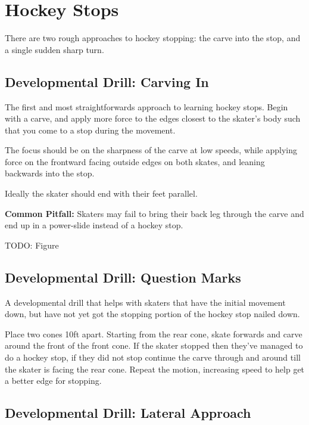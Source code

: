 \section{Hockey Stops}
\label{sec:stopping/hockey}

There are two rough approaches to hockey stopping: the carve into the stop, and a single sudden sharp turn.   

\subsection*{Developmental Drill: Carving In} 

The first and most straightforwards approach to learning hockey stops.
Begin with a carve, and apply more force to the edges closest to the skater's body such that you come to a stop during the movement.   

The focus should be on the sharpness of the carve at low speeds, while applying force on the frontward facing outside edges on both skates, and leaning backwards into the stop. 

Ideally the skater should end with their feet parallel.

{\bf Common Pitfall:} Skaters may fail to bring their back leg through the carve and end up in a power-slide instead of a hockey stop. 

{\color{red} TODO: Figure}


\subsection*{Developmental Drill: Question Marks} 

A developmental drill that helps with skaters that have the initial movement down, but have not yet got the stopping portion of the hockey stop nailed down.      

Place two cones 10ft apart. 
Starting from the rear cone, skate forwards and carve around the front of the front cone.       
If the skater stopped then they've managed to do a hockey stop, if they did not stop continue the carve through and around till the skater is facing the rear cone. 
Repeat the motion, increasing speed to help get a better edge for stopping.



\subsection*{Developmental Drill: Lateral Approach} 

